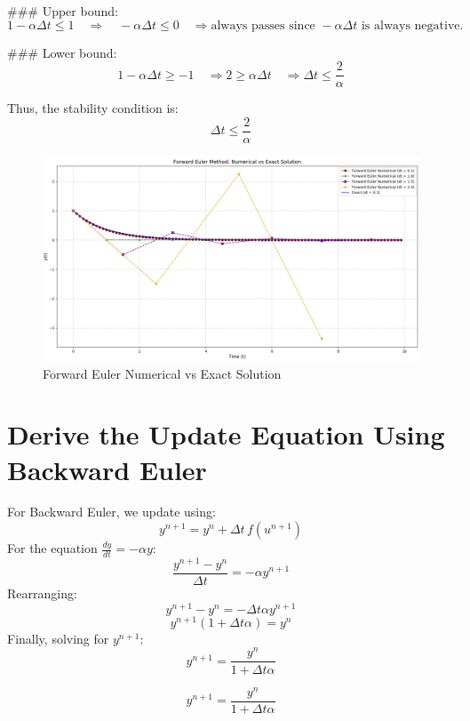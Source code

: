 \documentclass[11pt]{article}
\begin{document}
### Upper bound:
\[
1 - \alpha \Delta t \leq 1 \quad \Rightarrow \quad -\alpha \Delta t \leq 0 \quad \Rightarrow \text{always passes since } -\alpha \Delta t \text{ is always negative.}
\]

### Lower bound:
\[
1 - \alpha \Delta t \geq -1 \quad \Rightarrow 2 \geq \alpha \Delta t \quad \Rightarrow \Delta t \leq \frac{2}{\alpha}
\]

Thus, the stability condition is:
\[
\Delta t \leq \frac{2}{\alpha}
\]

\begin{figure}[!ht]
    \centering
    \includegraphics[width= 1 \textwidth]{images/Forward Euler.jpg}
    \caption{Forward Euler Numerical vs Exact Solution}
    \label{fig:3}
    \end{figure}
    \FloatBarrier

\section{Derive the Update Equation Using Backward Euler}

For Backward Euler, we update using:
\[
y^{n+1} = y^n + \Delta t \, f(u^{n+1})
\]
For the equation \(\frac{dy}{dt} = -\alpha y\):
\[
\frac{y^{n+1} - y^n}{\Delta t} = -\alpha y^{n+1}
\]
Rearranging:
\[
y^{n+1} - y^n = -\Delta t \alpha y^{n+1}
\]
\[
y^{n+1}(1 + \Delta t \alpha) = y^n
\]
Finally, solving for \(y^{n+1}\):
\[
y^{n+1} = \frac{y^n}{1 + \Delta t \alpha}
\]

\begin{tcolorbox}
\[
y^{n+1} = \frac{y^n}{1 + \Delta t \alpha}
\]
\end{tcolorbox}
\end{document}
